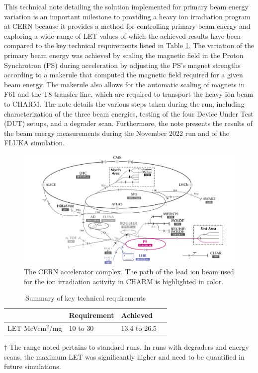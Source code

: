 \documentclass{cernatsnote}
\begin{document}
This technical note detailing the solution implemented for primary beam energy variation is an important milestone to providing a heavy ion irradiation program at CERN because it provides a method for controlling primary beam energy and exploring a wide range of LET values of which the achieved results have been compared to the key technical requirements listed in Table \ref{tab:technical_requirements}. The variation of the primary beam energy was achieved by scaling the magnetic field in the Proton Synchrotron (PS) during acceleration by adjusting the PS's magnet strengths according to a makerule that computed the magnetic field required for a given beam energy. The makerule also allows for the automatic scaling of magnets in F61 and the T8 transfer line, which are required to transport the heavy ion beam to CHARM. The note details the various steps taken during the run, including characterization of the three beam energies, testing of the four Device Under Test (DUT) setups, and a degrader scan. Furthermore, the note presents the results of the beam energy measurements during the November 2022 run and of the FLUKA simulation.

\begin{figure}[!htb]
\centering
\includegraphics[width=1.0\textwidth]{images/CCC_eastt8_small.png}
\caption{The CERN accelerator complex. The path of the lead ion beam used for the ion irradiation activity in CHARM is highlighted in color.}
\label{fig:CCC}
\end{figure}

\begin{table}[!htp]
\centering
\begin{threeparttable}
\caption{Summary of key technical requirements}
\label{tab:technical_requirements}
\begin{tabular}{@{}p{3.5cm}p{3cm}p{3.5cm}p{5cm}@{}}
\toprule
    & Requirement & Achieved\\
\midrule
LET MeVcm$^2$/mg & 10 to 30 & 13.4 to 26.5\tnote{$\dagger$} \cite{waets_tr1_2023}\\\bottomrule
\end{tabular}
\begin{tablenotes}
\item[$\dagger$] The range noted pertains to standard runs. In runs with degraders and energy scans, the maximum LET was significantly higher and need to be quantified in future simulations.
\end{tablenotes}
\end{threeparttable}
\end{table}
\end{document}
